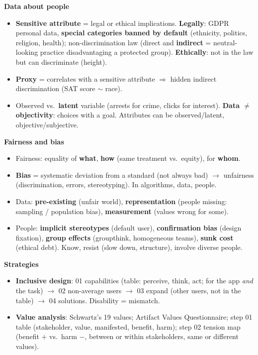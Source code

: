 \documentclass[11pt,a4paper,openany]{book}
\begin{document}
\begin{recapbox}[title={Exam-ready recap --- Fairness 1}]
\textbf{Data about people}
\begin{itemize}
  \item \textbf{Sensitive attribute} = legal or ethical implications. \textbf{Legally}: GDPR
        personal data, \textbf{special categories banned by default} (ethnicity, politics,
        religion, health); non-discrimination law (direct and \textbf{indirect} = neutral-looking
        practice disadvantaging a protected group). \textbf{Ethically}: not in the law but can
        discriminate (height).
  \item \textbf{Proxy} = correlates with a sensitive attribute $\Rightarrow$ hidden indirect
        discrimination (SAT score $\sim$ race).
  \item Observed vs.\ \textbf{latent} variable (arrests for crime, clicks for interest).
        \textbf{Data $\neq$ objectivity}: choices with a goal. Attributes can be observed/latent,
        objective/subjective.
\end{itemize}
\textbf{Fairness and bias}
\begin{itemize}
  \item Fairness: equality of \textbf{what}, \textbf{how} (same treatment vs.\ equity), for
        \textbf{whom}.
  \item \textbf{Bias} = systematic deviation from a standard (not always bad) $\to$ unfairness
        (discrimination, errors, stereotyping). In algorithms, data, people.
  \item Data: \textbf{pre-existing} (unfair world), \textbf{representation} (people missing:
        sampling / population bias), \textbf{measurement} (values wrong for some).
  \item People: \textbf{implicit stereotypes} (default user), \textbf{confirmation bias}
        (design fixation), \textbf{group effects} (groupthink, homogeneous teams), \textbf{sunk
        cost} (ethical debt). Know, resist (slow down, structure), involve diverse people.
\end{itemize}
\textbf{Strategies}
\begin{itemize}
  \item \textbf{Inclusive design}: 01 capabilities (table: perceive, think, act; for the app
        \emph{and} the task) $\to$ 02 non-average users $\to$ 03 expand (other users, not in the
        table) $\to$ 04 solutions. Disability = mismatch.
  \item \textbf{Value analysis}: Schwartz's 19 values; Artifact Values Questionnaire; step 01
        table (stakeholder, value, manifested, benefit, harm); step 02 tension map
        (benefit $+$ vs.\ harm $-$, between or within stakeholders, same or different values).
\end{itemize}
\end{recapbox}
\end{document}

